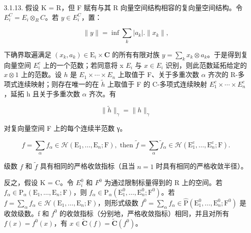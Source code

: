 3.1.13. 假设 K = R，但 F 赋有与其 R 向量空间结构相容的复向量空间结构。令 \(E_{i}^{C} = E_{i} \otimes_{R} C\)。若 \(y \in E_{i}^{C}\)，置：

\[
\| y \| = \inf \sum_ {k} | a _ {k} |. \| x _ {k} \|,
\]

下确界取遍满足 \((x_{k}, a_{k}) \in \mathrm{E}_{i} \times \mathbf{C}\) 的所有有限对族 \(y = \sum_{k} x_{k} \otimes a_{k}\)。于是得到复向量空间 \(E_{i}^{c}\) 上的一个范数；若同意将 x  \(E_{i}\) 与 \(x \in E_{i}\) 识别，则此范数延拓给定的 \(x \otimes 1\) 上的范数。设 \(h\) 是 \(E_{1} \times \cdots \times E_{n}\) 上取值于 F、关于多重次数 \(\alpha\) 齐次的 R-多项式连续映射；则存在唯一的在 \(\tilde{h}\) 上取值于 F 的 C-多项式连续映射 \(E_{1}^{c} \times \cdots \times E_{n}^{c}\)，延拓 h 且关于多重次数 \(\alpha\) 齐次。有

\[
\| \tilde {h} \| _ {\gamma} = \| h \| _ {\gamma}
\]

对复向量空间 F 上的每个连续半范数 γ。

\[
f = \sum_ {\alpha} f _ {\alpha} \in \mathcal {H} (\mathrm{E} _ {1}, \dots , \mathrm{E} _ {n}; \mathrm{F}), \text {   then   } \tilde {f} = \sum_ {\alpha} \tilde {f} _ {\alpha} \in \mathcal {H} (\mathrm{E} _ {1} ^ {\mathrm{c}}, \dots , \mathrm{E} _ {n} ^ {\mathrm{c}}; \mathrm{F}).
\]

级数 \(f\) 和 \(\tilde{f}\) 具有相同的严格收敛指标（且当 \(n = 1\) 时具有相同的严格收敛半径）。

反之，假设 K = C。令 \(E_{i}^{0}\) 和 \(F^{0}\) 为通过限制标量得到的 R 上的空间。若 \(f_{\alpha} \in \mathrm{P}_{\alpha}(\mathrm{E}_{1}, \ldots, \mathrm{E}_{n}; \mathrm{F})\)，则 \(f_{\alpha} \in \mathrm{P}_{\alpha}(\mathrm{E}_{1}^{0}, \ldots, \mathrm{E}_{n}^{0}; \mathrm{F}^{0})\)。若 \(f = \sum_{\alpha} f_{\alpha} \in \mathcal{H}(\mathrm{E}_{1}, \ldots, \mathrm{E}_{n}; \mathrm{F})\)，则形式级数 \(f^{0} = \sum_{\alpha} f_{\alpha} \in \hat{\mathrm{P}}(\mathrm{E}_{1}^{0}, \ldots, \mathrm{E}_{n}^{0}; \mathrm{F}^{0})\) 是收敛级数。f 和 \(f^{0}\) 的收敛指标（分别地，严格收敛指标）相同，并且对所有 \(f(x) = f^{0}(x)\)，有 \(x \in \tilde{\mathbf{C}}(f) = \tilde{\mathbf{C}}(f^{0})\)。

